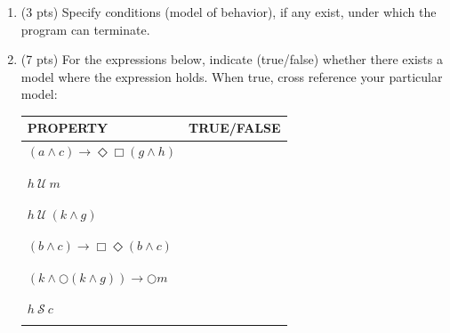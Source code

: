 \documentclass[12pt]{article}
\begin{document}
\begin{enumerate}
\item (3 pts) Specify conditions (model of behavior), if any exist, under which the program can terminate.

\item (7 pts) For the expressions below, indicate (true/false) whether there exists a 
model where the expression holds. When true, cross reference your particular model:

\begin{table}
\centering
\begin{tabular}{|l|l|}
\hline
\textbf{PROPERTY}							& \textbf{TRUE/FALSE}\\
\hline

$(a \wedge c) \rightarrow \Diamond \Box (g \wedge h)$	 &\\

&\\

\hline

&\\
		
$h ~\mathcal{U}~ m$									 &\\

&\\

\hline

&\\
		
$h ~\mathcal{U}~ (k \wedge g)$						 &\\

&\\

\hline

&\\
		
$(b \wedge c) \rightarrow \Box \Diamond (b \wedge c)$  &\\

&\\

\hline

&\\
		
$(k \wedge \bigcirc (k \wedge g)) \rightarrow \bigcirc m$  &\\

&\\

\hline

&\\
		
$ h ~\mathcal{S}~ c$								 &\\

&\\


\end{tabular}
\end{table}
\end{enumerate}
\end{document}
